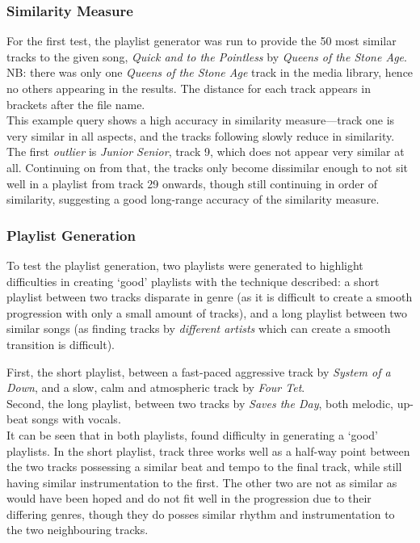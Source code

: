 \subsubsection{Similarity Measure}
For the first test, the playlist generator was run to provide the 50 most similar tracks to the given song, \emph{Quick and to the Pointless} by \emph{Queens of the Stone Age}. NB: there was only one \emph{Queens of the Stone Age} track in the media library, hence no others appearing in the results. The distance for each track appears in brackets after the file name.\\

This example query shows a high accuracy in similarity measure---track one is very similar in all aspects, and the tracks following slowly reduce in similarity. The first \emph{outlier} is \emph{Junior Senior}, track 9, which does not appear very similar at all. Continuing on from that, the tracks only become dissimilar enough to not sit well in a playlist from track 29 onwards, though still continuing in order of similarity, suggesting a good long-range accuracy of the similarity measure. 
\subsubsection{Playlist Generation}
To test the playlist generation, two playlists were generated to highlight difficulties in creating `good' playlists with the technique described: a short playlist between two tracks disparate in genre (as it is difficult to create a smooth progression with only a small amount of tracks), and a long playlist between two similar songs (as finding tracks by \emph{different artists} which can create a smooth transition is difficult).

First, the short playlist, between a fast-paced aggressive track by \emph{System of a Down}, and a slow, calm and atmospheric track by \emph{Four Tet}.\\

Second, the long playlist, between two tracks by \emph{Saves the Day}, both melodic, up-beat songs with vocals.\\

It can be seen that in both playlists,  found difficulty in generating a `good' playlists. In the short playlist, track three works well as a half-way point between the two tracks possessing a similar beat and tempo to the final track, while still having similar instrumentation to the first. The other two are not as similar as would have been hoped and do not fit well in the progression due to their differing genres, though they do posses similar rhythm and instrumentation to the two neighbouring tracks.

